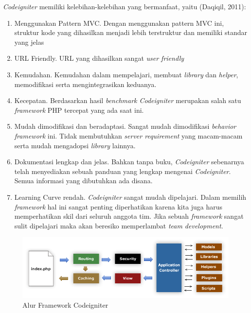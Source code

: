     \emph{Codeigniter} memiliki kelebihan-kelebihan yang bermanfaat, yaitu (Daqiqil, 2011):
    \begin{enumerate}
        \itemsep0em
        \item Menggunakan Pattern MVC. Dengan menggunakan pattern MVC ini, struktur kode yang dihasilkan menjadi lebih terstruktur dan memiliki standar yang jelas
        \item URL Friendly. URL yang dihasilkan sangat \emph{user friendly}
        \item Kemudahan. Kemudahan dalam mempelajari, membuat \emph{library} dan \emph{helper}, memodifikasi serta mengintegrasikan keduanya.
        \item Kecepatan. Berdasarkan hasil \emph{benchmark Codeigniter} merupakan salah satu \emph{framework} PHP tercepat yang ada saat ini.
        \item Mudah dimodifikasi dan beradaptasi. Sangat mudah dimodifikasi \emph{behavior framework} ini. Tidak membutuhkan \emph{server requirement} yang macam-macam serta mudah mengadopsi \emph{library} lainnya.
        \item Dokumentasi lengkap dan jelas. Bahkan tanpa buku, \emph{Codeigniter} sebenarnya telah menyediakan sebuah panduan yang lengkap mengenai \emph{Codeigniter}. Semua informasi yang dibutuhkan ada disana.
        \item Learning Curve rendah. \emph{Codeigniter} sangat mudah dipelajari. Dalam memilih \emph{framework} hal ini sangat penting diperhatikan karena kita juga harus memperhatikan skil dari seluruh anggota tim. Jika sebuah \emph{framework} sangat sulit dipelajari maka akan beresiko memperlambat \emph{team development}.
    \end{enumerate}
    \begin{figure}[H]
        \centering
          \includegraphics[width=14cm]{gambar/codeigniter}
          \caption{Alur Framework Codeigniter}
          \label{codeigniter}
      \end{figure}
    
